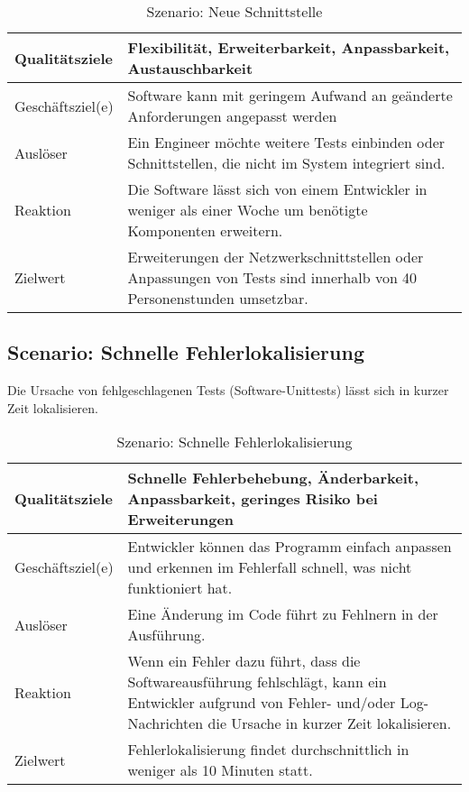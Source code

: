 \documentclass[
	ngerman,
	toc=listof, %
	toc=bibliography, %
	footnotes=multiple, %
	parskip=half, %
	numbers=noendperiod %
]{scrartcl}
\begin{document}
			\begin{table}[!h]
				\begin{tabularx}{\textwidth}{lX}
					\toprule
					Qualitätsziele & Flexibilität, Erweiterbarkeit, Anpassbarkeit, Austauschbarkeit  \\
					\midrule
					Geschäftsziel(e) & Software kann mit geringem Aufwand an geänderte Anforderungen angepasst werden  \\
					\midrule
					Auslöser & Ein Engineer möchte weitere Tests einbinden oder Schnittstellen, die nicht im System integriert sind.  \\
					\midrule
					Reaktion & Die Software lässt sich von einem Entwickler in weniger als einer Woche um benötigte Komponenten erweitern.  \\
					\midrule
					Zielwert & 	Erweiterungen der Netzwerkschnittstellen oder Anpassungen von Tests sind innerhalb von 40 Personenstunden umsetzbar.  \\
					\bottomrule
				\end{tabularx}
				\caption{Szenario: Neue Schnittstelle}
			\end{table}
			

		\subsection{Scenario: Schnelle Fehlerlokalisierung}
			Die Ursache von fehlgeschlagenen Tests (Software-Unittests) lässt sich in kurzer Zeit lokalisieren.
			
			\begin{table}[!h]
				\begin{tabularx}{\textwidth}{lX}
					\toprule
					Qualitätsziele & Schnelle Fehlerbehebung, Änderbarkeit, Anpassbarkeit, geringes Risiko bei Erweiterungen  \\
					\midrule
					Geschäftsziel(e) & Entwickler können das Programm einfach anpassen und erkennen im Fehlerfall schnell, was nicht funktioniert hat.  \\
					\midrule
					Auslöser & Eine Änderung im Code führt zu Fehlnern in der Ausführung.  \\
					\midrule
					Reaktion & Wenn ein Fehler dazu führt, dass die Softwareausführung fehlschlägt, kann ein Entwickler aufgrund von Fehler- und/oder Log-Nachrichten die Ursache in kurzer Zeit lokalisieren.  \\
					\midrule
					Zielwert & Fehlerlokalisierung findet durchschnittlich in weniger als 10 Minuten statt.  \\
					\bottomrule
				\end{tabularx}
				\caption{Szenario: Schnelle Fehlerlokalisierung}
			\end{table}
			
\end{document}
